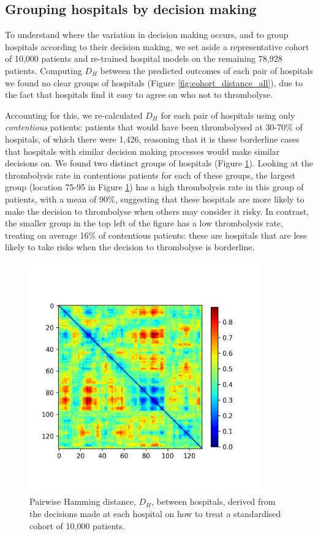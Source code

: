 \documentclass[12pt,a4paper, pdftex]{elsarticle}
\begin{document}
\subsection{Grouping hospitals by decision making}

To understand where the variation in decision making occurs, and to group hospitals according to their decision making, we set aside a representative cohort of 10,000 patients and re-trained hospital models on the remaining 78,928 patients. Computing $D_H$ between the predicted outcomes of each pair of hospitals we found no clear groups of hospitals (Figure \ref{fig:cohort_distance_all}), due to the fact that hospitals find it easy to agree on who not to thrombolyse. 

Accounting for this, we re-calculated $D_H$ for each pair of hospitals using only {\it contentious} patients: patients that would have been thrombolysed at 30-70\% of hospitals, of which there were 1,426, reasoning that it is these borderline cases that hospitals with similar decision making processes would make similar decisions on. We found two distinct groups of hospitals (Figure \ref{fig:contentious}). Looking at the thrombolysis rate in contentious patients for each of these groups, the largest group (location 75-95 in Figure \ref{fig:contentious}) has a high thrombolysis rate in this group of patients, with a mean of 90\%, suggesting that these hospitals are more likely to make the decision to thrombolyse when others may consider it risky. 
In contrast, the smaller group in the top left of the figure has a low thrombolysis rate, treating on average 16\% of contentious patients: these are hospitals that are less likely to take risks when the decision to thrombolyse is borderline. 

\begin{figure}[h!]
\centering
\includegraphics[width=10cm]{figures/cohort_distance.jpg}
\caption{Pairwise Hamming distance, $D_H$, between hospitals, derived from the decisions made at each hospital on how to treat a standardised cohort of 10,000 patients.}
\label{fig:contentious}
\end{figure}
\end{document}
